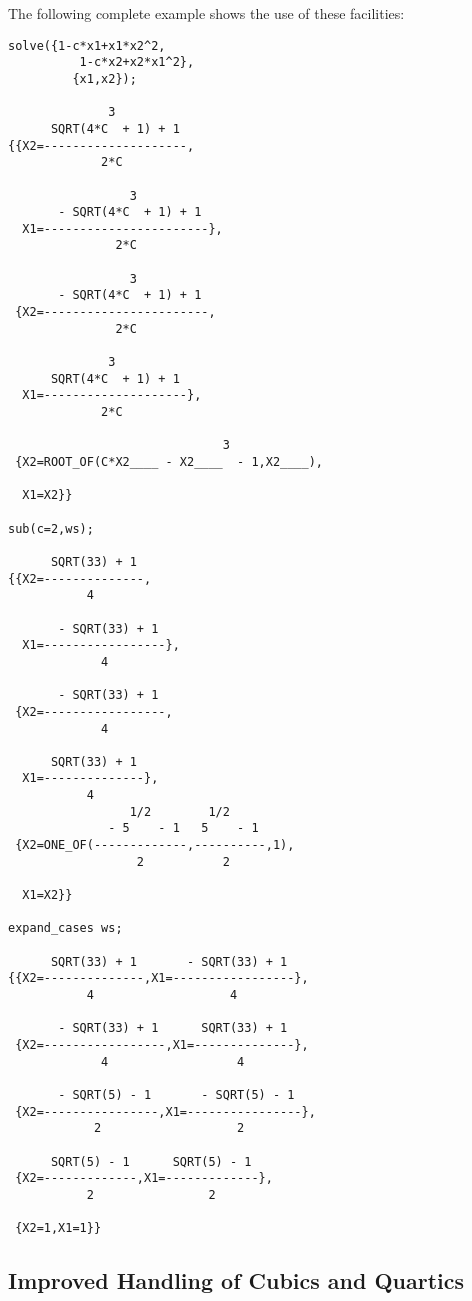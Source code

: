 The following complete example shows the use of these facilities:
\begin{verbatim}
solve({1-c*x1+x1*x2^2,
          1-c*x2+x2*x1^2},
         {x1,x2});

              3
      SQRT(4*C  + 1) + 1
{{X2=--------------------,
             2*C

                 3
       - SQRT(4*C  + 1) + 1
  X1=-----------------------},
               2*C

                 3
       - SQRT(4*C  + 1) + 1
 {X2=-----------------------,
               2*C

              3
      SQRT(4*C  + 1) + 1
  X1=--------------------},
             2*C

                              3
 {X2=ROOT_OF(C*X2____ - X2____  - 1,X2____),

  X1=X2}}

sub(c=2,ws);

      SQRT(33) + 1
{{X2=--------------,
           4

       - SQRT(33) + 1
  X1=-----------------},
             4

       - SQRT(33) + 1
 {X2=-----------------,
             4

      SQRT(33) + 1
  X1=--------------},
           4
                 1/2        1/2
              - 5    - 1   5    - 1
 {X2=ONE_OF(-------------,----------,1),
                  2           2

  X1=X2}}

expand_cases ws;

      SQRT(33) + 1       - SQRT(33) + 1
{{X2=--------------,X1=-----------------},
           4                   4

       - SQRT(33) + 1      SQRT(33) + 1
 {X2=-----------------,X1=--------------},
             4                  4

       - SQRT(5) - 1       - SQRT(5) - 1
 {X2=----------------,X1=----------------},
            2                   2

      SQRT(5) - 1      SQRT(5) - 1
 {X2=-------------,X1=-------------},
           2                2

 {X2=1,X1=1}}

\end{verbatim}

\subsection{Improved Handling of Cubics and Quartics}

